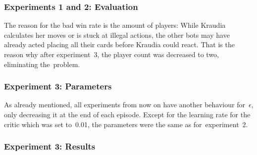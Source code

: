 \documentclass[a4paper,titlepage]{article}
\begin{document}
\subsubsection*{Experiments 1 and 2: Evaluation}

The reason for the bad win rate is the amount of players: While Kraudia calculates her moves or is stuck at illegal actions, the other bots may have already acted placing all their cards before Kraudia could react. That is the reason why after experiment~3, the player count was decreased to two, eliminating the~problem.

\subsubsection*{Experiment 3: Parameters}

As already mentioned, all experiments from now on have another behaviour for~$\epsilon$, only decreasing it at the end of each episode.
Except for the learning rate for the critic which was set to~0.01, the parameters were the same as for~experiment~2.

\subsubsection*{Experiment 3: Results}
\end{document}
